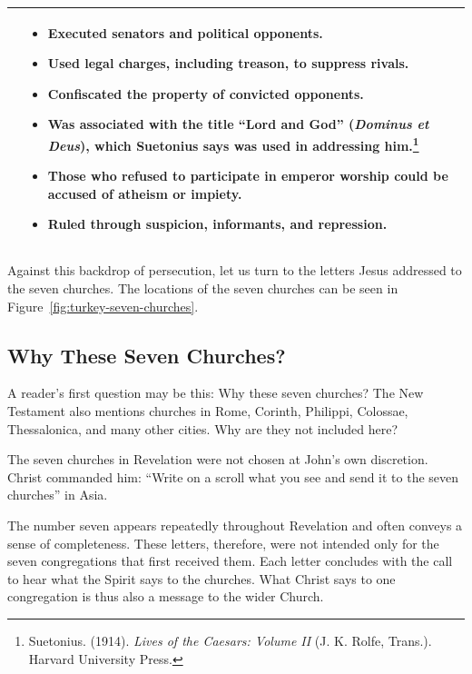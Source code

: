 {\begin{longtable}{|p{2.5cm}|p{6.5cm}|}
&
\vspace{-0.3cm}
\begin{itemize}[nosep, leftmargin=10pt]
\item Executed senators and political opponents.
\item Used legal charges, including treason, to suppress rivals.
\item Confiscated the property of convicted opponents.
\item Was associated with the title ``Lord and God'' (\textit{Dominus et Deus}), which Suetonius says was used in addressing him.\footnote{Suetonius. (1914). \textit{Lives of the Caesars: Volume II} (J. K. Rolfe, Trans.). Harvard University Press.}
\item Those who refused to participate in emperor worship could be accused of atheism or impiety.
\item Ruled through suspicion, informants, and repression.
\end{itemize}
\\
\hline
\end{longtable}
}

Against this backdrop of persecution, let us turn to the letters Jesus addressed to the seven churches. The locations of the seven churches can be seen in Figure~\ref{fig:turkey-seven-churches}.

\normalsize

\subsection{Why These Seven Churches?}

A reader's first question may be this: Why these seven churches? The New Testament also mentions churches in Rome, Corinth, Philippi, Colossae, Thessalonica, and many other cities. Why are they not included here?

The seven churches in Revelation were not chosen at John's own discretion. Christ commanded him: ``Write on a scroll what you see and send it to the seven churches'' in Asia.

The number seven appears repeatedly throughout Revelation and often conveys a sense of completeness. These letters, therefore, were not intended only for the seven congregations that first received them. Each letter concludes with the call to hear what the Spirit says to the churches. What Christ says to one congregation is thus also a message to the wider Church.

